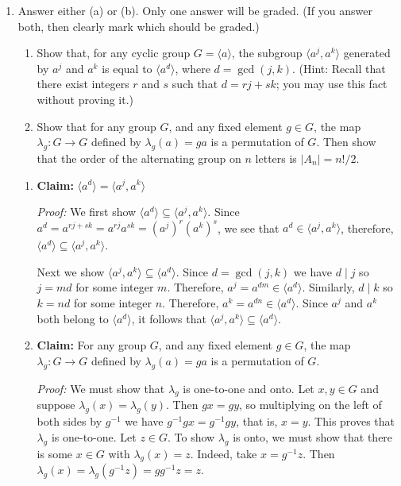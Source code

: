 \documentclass[12pt]{article}
\newcommand{\<}{\ensuremath{\langle}}
\renewcommand{\>}{\ensuremath{\rangle}}
\newcommand{\divides}{\ensuremath{\mid}}
\begin{document}
\begin{enumerate}[{\bf 1.}]
      \newpage
    \item
      Answer either (a) or (b). Only one answer will be graded.  (If
      you answer both, then clearly mark which should be graded.)
      \begin{enumerate}
      \item 
        Show that, for any cyclic group $G = \<a\>$, 
        the subgroup $\<a^j, a^k\>$ generated by $a^j$ and $a^k$ is equal to
        $\<a^d\>$, where $d = \gcd(j,k)$.
        (Hint: Recall that there exist integers $r$ and $s$ such that $d = rj + sk$; you
        may use this fact without proving it.)
      \item
        Show that for any group $G$, and any fixed element $g \in G$,
        the map $\lambda_g : G \rightarrow G$ defined by
        $\lambda_g(a) = g a$ is a permutation of $G$.
        Then show that the order of the alternating group on $n$ letters is $|A_n| = n!/2$.
      \end{enumerate}

    \medskip

    \begin{enumerate}
    \item {\bf Claim:} $\<a^d\> = \<a^j, a^k\>$

    \medskip

    {\it Proof:}
    We first show $\<a^d\> \subseteq \<a^j, a^k\>$.
    Since $a^d = a^{rj+sk} = a^{rj}a^{sk} = (a^j)^r(a^k)^s$, we see that 
    $a^d \in \<a^j, a^k\>$, therefore, 
    $\<a^d\> \subseteq \<a^j, a^k\>$.
    
    Next we show $\<a^j, a^k\> \subseteq \<a^d\>$.  
    Since $d = \gcd(j,k)$ we
    have $d \divides j$ so $j = md$ for some integer $m$.  Therefore, 
    $a^j = a^{dm} \in \<a^d\>$.
    Similarly, $d \divides k$ so $k = nd$ for some integer $n$.  Therefore, 
    $a^k = a^{dn} \in \<a^d\>$. Since $a^j$ and $a^k$ both belong to $\<a^d\>$,
    it follows that $\<a^j, a^k\> \subseteq \<a^d\>$.  

    \vskip1cm

  \item
{\bf Claim:}  For any group $G$, and any fixed element $g \in G$,
        the map $\lambda_g : G \rightarrow G$ defined by
        $\lambda_g(a) = g a$ is a permutation of $G$.

        \medskip

        {\it Proof:} We must show that $\lambda_g$ is one-to-one and onto.  Let
        $x, y \in G$ and suppose $\lambda_g(x) = \lambda_g(y)$.  Then $gx = gy$,
        so multiplying on the left of both sides by $g^{-1}$ we have
        $g^{-1}gx = g^{-1}gy$, that is,  $x = y$.  This proves that $\lambda_g$
        is one-to-one.  Let $z \in G$. To show $\lambda_g$ is onto, we must show
        that there is some $x \in G$ with $\lambda_g(x) = z$. Indeed, take 
        $x = g^{-1}z$.  Then $\lambda_g(x) = \lambda_g(g^{-1}z) = gg^{-1}z = z$.


\end{enumerate}
\end{enumerate}
\end{document}
